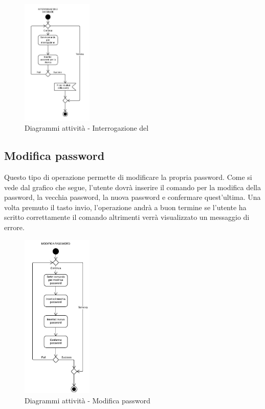 \documentclass{scalatekids-article}
\begin{document}
\begin{figure}[H]
  \begin{center}
    \includegraphics[width=0.3\textwidth, keepaspectratio]{img/diagrammiAttivita/query.jpeg}
    \caption{Diagrammi attività - Interrogazione del }
  \end{center}
\end{figure}

\subsection{Modifica password}

Questo tipo di operazione permette di modificare la propria password. Come si
vede dal grafico che segue, l'utente dovrà inserire il comando per la modifica
della password, la vecchia password, la nuova password e confermare
quest'ultima. Una volta premuto il tasto invio, l'operazione andrà a buon
termine se l'utente ha scritto correttamente il comando altrimenti verrà
visualizzato un messaggio di errore.

\begin{figure}[H]
  \begin{center}
    \includegraphics[width=0.3\textwidth, keepaspectratio]{img/diagrammiAttivita/modificaPsw.jpeg}
    \caption{Diagrammi attività - Modifica password}
  \end{center}
\end{figure}
\end{document}
